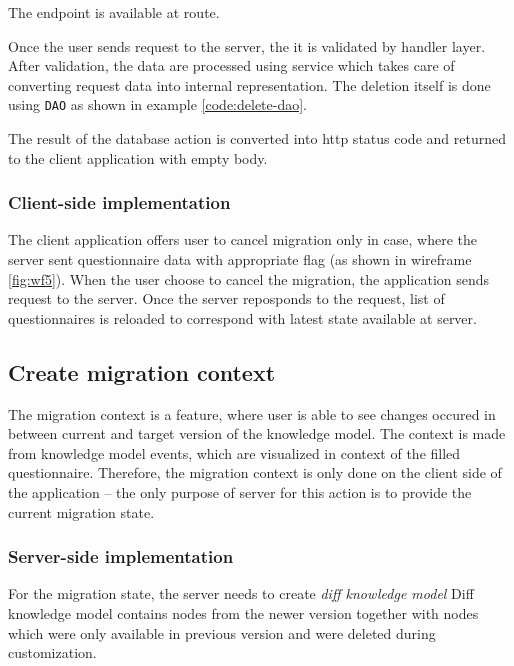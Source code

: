 The endpoint is available at  route.

Once the user sends request to the server, the it is validated by handler layer.
After validation, the data are processed using service which takes care of converting request data into internal representation.
The deletion itself is done using \texttt{DAO} as shown in example \ref{code:delete-dao}.


The result of the database action is converted into \gls{http} status code and returned to the client application with empty body.

\subsubsection*{Client-side implementation}

The client application offers user to cancel migration only in case, where the server sent questionnaire data with appropriate flag (as shown in wireframe \ref{fig:wf5}).
When the user choose to cancel the migration, the application sends request to the server.
Once the server reposponds to the request, list of questionnaires is reloaded to correspond with latest state available at server.

\subsection{Create migration context}

The migration context is a feature, where user is able to see changes occured in between current and target version of the knowledge model.
The context is made from knowledge model events, which are visualized in context of the filled questionnaire.
Therefore, the migration context is only done on the client side of the application -- the only purpose of server for this action is to provide the current migration state.

\subsubsection*{Server-side implementation}

For the migration state, the server needs to create \textit{diff knowledge model}
Diff knowledge model contains nodes from the newer version together with nodes which were only available in previous version and were deleted during customization.


